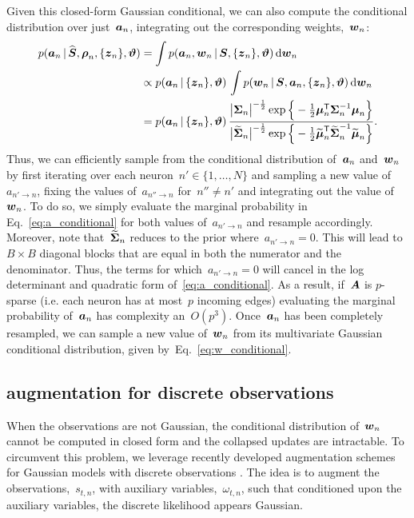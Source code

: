 Given this closed-form Gaussian conditional, we can also compute
the conditional distribution over just~$\boldsymbol{a}_n$, integrating out
the corresponding weights,~$\boldsymbol{w}_n$:
\begin{align}
  \nonumber
  p(\boldsymbol{a}_n \,|\, \widehat{\boldsymbol{S}}, \boldsymbol{\rho}_n, \{\boldsymbol{z}_n\}, \boldsymbol{\vartheta})
  &= \int p(\boldsymbol{a}_n, \boldsymbol{w}_n \,|\, {\boldsymbol{S}}, \{\boldsymbol{z}_n\}, \boldsymbol{\vartheta}) \, \mathrm{d} \boldsymbol{w}_n \\
  \nonumber
  &\propto p(\boldsymbol{a}_n \,|\, \{\boldsymbol{z}_n\}, \boldsymbol{\vartheta}) \, \int p(\boldsymbol{w}_n \,|\, {\boldsymbol{S}}, \boldsymbol{a}_n, \{\boldsymbol{z}_n\}, \boldsymbol{\vartheta}) \, \mathrm{d} \boldsymbol{w}_n \\
  \label{eq:a_conditional}
  &= p(\boldsymbol{a}_n \,|\, \{\boldsymbol{z}_n\}, \boldsymbol{\vartheta}) \, \frac{\big| \boldsymbol{\Sigma}_n \big|^{-\frac{1}{2}} \exp \Big \{-\frac{1}{2} \boldsymbol{\mu}_n^{\mathsf{T}} \boldsymbol{\Sigma}_n^{-1} \boldsymbol{\mu}_n \Big \} }
  {\big| \widetilde{\boldsymbol{\Sigma}}_n \big|^{-\frac{1}{2}} \exp \Big \{-\frac{1}{2} \widetilde{\boldsymbol{\mu}}_n^{\mathsf{T}} \widetilde{\boldsymbol{\Sigma}}_n^{-1} \widetilde{\boldsymbol{\mu}}_n \Big \}}.
\end{align}
Thus, we can efficiently sample from the conditional
distribution of~$\boldsymbol{a}_n$ and~$\boldsymbol{w}_n$ by first iterating
over each neuron~${n' \in \{1, \ldots, N\}}$ and sampling
a new value of~$a_{n' \to n}$, fixing the values of~$a_{n'' \to n}$
for~$n'' \neq n'$ and integrating out the value of~$\boldsymbol{w}_n$.
To do so, we simply evaluate the marginal probability in Eq.~\ref{eq:a_conditional}
for both values of~$a_{n' \to n}$ and resample accordingly.
Moreover, note that~$\widetilde{\boldsymbol{\Sigma}}_n$ reduces to the prior
where~${a_{n' \to n}=0}$. This will lead to~${B \times B}$ diagonal blocks
that are equal in both the numerator and the denominator. Thus,
the terms for which~${a_{n' \to n}=0}$ will cancel in the log
determinant and quadratic form of~\ref{eq:a_conditional}.
As a result, if~$\boldsymbol{A}$ is $p$-sparse (i.e.  each neuron has
at most~$p$ incoming edges) evaluating the marginal probability
of~$\boldsymbol{a}_n$ has complexity an~$O(p^3)$.  Once~$\boldsymbol{a}_n$ has been
completely resampled, we can sample a new value of~$\boldsymbol{w}_n$ from its
multivariate Gaussian conditional distribution, given
by~Eq.~\ref{eq:w_conditional}.

\subsection{\polyagamma augmentation for discrete observations}
When the observations are not Gaussian, the conditional distribution
of~$\boldsymbol{w}_n$ cannot be computed in closed form and the collapsed
updates are intractable. To circumvent this problem, we leverage
recently developed augmentation schemes for Gaussian models with
discrete observations \citep{polson2013bayesian, Pillow2012}. The
idea is to augment the observations,~$s_{t,n}$, with auxiliary
variables,~$\omega_{t,n}$, such that conditioned upon the
auxiliary variables, the discrete likelihood appears Gaussian.

